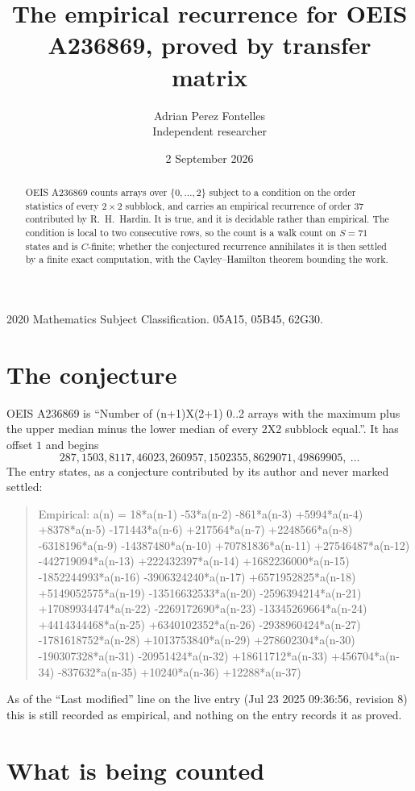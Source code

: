 \documentclass[11pt,a4paper]{article}
\title{The empirical recurrence for OEIS A236869, proved by transfer matrix}
\author{Adrian Perez Fontelles\\ \small Independent researcher}
\date{2 September 2026}
\theoremstyle{plain}
\theoremstyle{definition}
\begin{document}
\maketitle

\begin{abstract}
OEIS A236869 counts arrays over $\{0,\dots,2\}$ subject to a condition on the order
statistics of every $2\times2$ subblock, and carries an empirical recurrence of order
$37$ contributed by R.~H.~Hardin. It is true, and it is decidable rather than empirical.
The condition is local to two consecutive rows, so the count is a walk count on $S=71$
states and is $C$-finite; whether the conjectured recurrence annihilates it is then settled by
a finite exact computation, with the Cayley--Hamilton theorem bounding the work.
\end{abstract}

\noindent\small 2020 Mathematics Subject Classification. 05A15, 05B45, 62G30.\normalsize

\section{The conjecture}

OEIS A236869 is ``Number of (n+1)X(2+1) 0..2 arrays with the maximum plus the upper median minus the lower median of every 2X2 subblock equal.''. It has offset $1$ and begins
\[
287, 1503, 8117, 46023, 260957, 1502355, 8629071, 49869905,\ \dots
\]
The entry states, as a conjecture contributed by its author and never marked settled:
\begin{quote}
Empirical: a(n) = 18*a(n-1) -53*a(n-2) -861*a(n-3) +5994*a(n-4) +8378*a(n-5) -171443*a(n-6) +217564*a(n-7) +2248566*a(n-8) -6318196*a(n-9) -14387480*a(n-10) +70781836*a(n-11) +27546487*a(n-12) -442719094*a(n-13) +222432397*a(n-14) +1682236000*a(n-15) -1852244993*a(n-16) -3906324240*a(n-17) +6571952825*a(n-18) +5149052575*a(n-19) -13516632533*a(n-20) -2596394214*a(n-21) +17089934474*a(n-22) -2269172690*a(n-23) -13345269664*a(n-24) +4414344468*a(n-25) +6340102352*a(n-26) -2938960424*a(n-27) -1781618752*a(n-28) +1013753840*a(n-29) +278602304*a(n-30) -190307328*a(n-31) -20951424*a(n-32) +18611712*a(n-33) +456704*a(n-34) -837632*a(n-35) +10240*a(n-36) +12288*a(n-37)
\end{quote}
As of the ``Last modified'' line on the live entry (Jul 23 2025 09:36:56, revision 8) this is still
recorded as empirical, and nothing on the entry records it as proved.

\section{What is being counted}
\end{document}
